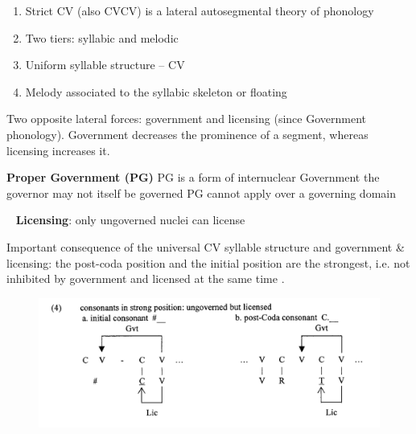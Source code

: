 \documentclass[a4paper, 12pt]{article}
\begin{document}
	\begin{enumerate}[$\gg$]
		\item Strict CV (also CVCV) is a lateral autosegmental theory of phonology \parencite{klv1990, scheer2012}
		\item Two tiers: syllabic and melodic
		\item Uniform syllable structure -- CV
		\item Melody associated to the syllabic skeleton or floating
	\end{enumerate}
	Two opposite lateral forces: government and licensing (since Government phonology). Government decreases the prominence of a segment, whereas licensing increases it.
	
	\pex
		\textbf{Proper Government (PG)}
			\a PG is a form of internuclear Government 
			\a the governor may not itself be governed 
			\a PG cannot apply over a governing domain	
	\xe

	\ex~
		\textbf{Licensing}: only ungoverned nuclei can license
	\xe
	
	\begin{figure}[H]
	\centering
	\end{figure}

	Important consequence of the universal CV syllable structure and government \& licensing: the post-coda position and the initial position are the strongest, i.e. not inhibited by government and licensed at the same time \parencite{segeral-scheer2008}.
	
	\begin{figure}[H]
		\includegraphics[width=\textwidth]{strongs}
	\end{figure}
		
\end{document}
